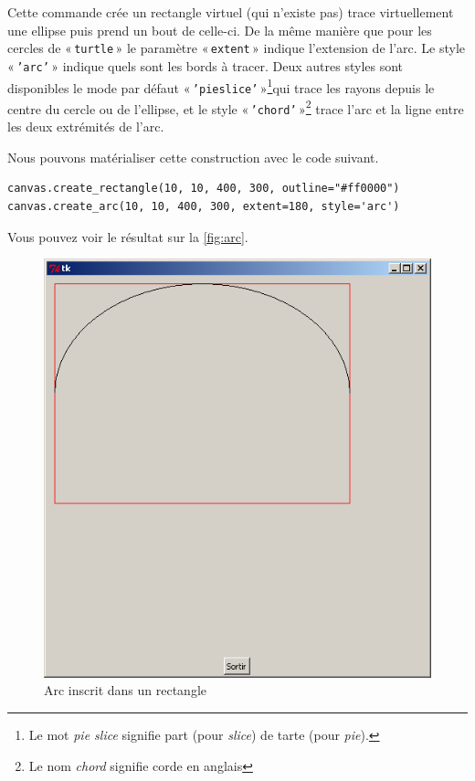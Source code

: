 Cette commande crée un rectangle virtuel (qui n'existe pas) trace virtuellement une ellipse puis prend un bout de celle-ci.
De la même manière que pour les cercles de « \texttt{turtle} » le paramètre « \texttt{extent} » indique l'extension de l'arc. Le style « \texttt{'arc'} » indique quels sont les bords à tracer. Deux autres styles sont disponibles le mode par défaut « \texttt{'pieslice'} »\footnote{Le mot \emph{pie slice} signifie part (pour \emph{slice}) de tarte (pour \emph{pie}).}qui trace les rayons depuis le centre du cercle ou de l'ellipse, et le style « \texttt{'chord'} »\footnote{Le nom \emph{chord} signifie corde en anglais} trace l'arc et la ligne entre les deux extrémités de l'arc.

Nous pouvons matérialiser cette construction avec le code suivant.

\begin{Verbatim}[frame=single,rulecolor=\color{mbleu}, label=à taper]
canvas.create_rectangle(10, 10, 400, 300, outline="#ff0000")
canvas.create_arc(10, 10, 400, 300, extent=180, style='arc')
\end{Verbatim}

Vous pouvez voir le résultat sur la \autoref{fig:arc}.
\begin{figure}[h!]
\centering
\includegraphics[scale=0.4]{images/arc}
\caption{Arc inscrit dans un rectangle}\label{fig:arc}
\end{figure}

